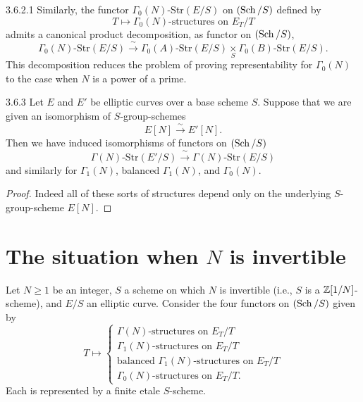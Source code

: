 \begin{prem}{3.6.2.1}\label{rem:3.6.2.1}
Similarly, the functor $\Gamma_0(N)$-Str$(E/S)$ on $(\operatorname{Sch}/S)$ defined by
\[
T \mapsto \Gamma_0(N)\text{-structures on } E_T/T
\]
admits a canonical product decomposition, as functor on $(\operatorname{Sch}/S)$,
\[
\Gamma_0(N)\text{-Str}(E/S) \xrightarrow{\ \sim\ } \Gamma_0(A)\text{-Str}(E/S) \underset{S}{\times} \Gamma_0(B)\text{-Str}(E/S).
\]
This decomposition reduces the problem of proving representability for $\Gamma_0(N)$ to the case when $N$ is a power of a prime.
\end{prem}

\begin{pprop}{3.6.3}\label{prop:3.6.3}
Let $E$ and $E'$ be elliptic curves over a base scheme $S$. Suppose that we are given an isomorphism of $S$-group-schemes
\[
E[N] \xrightarrow{\ \sim\ } E'[N].
\]
Then we have induced isomorphisms of functors on $(\operatorname{Sch}/S)$
\[
\Gamma(N)\text{-Str}(E'/S) \xrightarrow{\ \sim\ } \Gamma(N)\text{-Str}(E/S)
\]
and similarly for $\Gamma_1(N)$, balanced $\Gamma_1(N)$, and $\Gamma_0(N)$.
\end{pprop}

\begin{proof}
Indeed all of these sorts of structures depend only on the underlying $S$-group-scheme $E[N]$.
\end{proof}

\section{The situation when $N$ is invertible}
\label{sec:3.7}

\begin{theorem}\label{thm:3.7.1}
Let $N \ge 1$ be an integer, $S$ a scheme on which $N$ is invertible (i.e., $S$ is a $\mathbb{Z}[1/N]$-scheme), and $E/S$ an elliptic curve. Consider the four functors on $(\operatorname{Sch}/S)$ given by
\[
T \mapsto \begin{cases}
\Gamma(N)\text{-structures on } E_T/T \\
\Gamma_1(N)\text{-structures on } E_T/T \\
\text{balanced } \Gamma_1(N)\text{-structures on } E_T/T \\
\Gamma_0(N)\text{-structures on } E_T/T.
\end{cases}
\]
Each is represented by a finite etale $S$-scheme.
\end{theorem}

